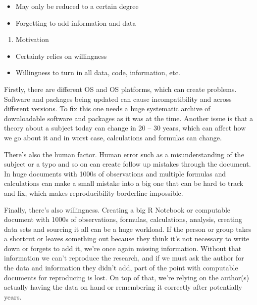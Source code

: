 \documentclass[
  12pt,
  twoside]{article}
\providecommand{\tightlist}{%
  \setlength{\itemsep}{0pt}\setlength{\parskip}{0pt}}
\begin{document}
\begin{itemize}
\tightlist
\item
  May only be reduced to a certain degree
\item
  Forgetting to add information and data
\end{itemize}

\begin{enumerate}
\def\labelenumi{\arabic{enumi}.}
\setcounter{enumi}{3}
\tightlist
\item
  Motivation
\end{enumerate}

\begin{itemize}
\tightlist
\item
  Certainty relies on willingness
\item
  Willingness to turn in all data, code, information, etc.
\end{itemize}

Firstly, there are different OS and OS platforms, which can create
problems. Software and packages being updated can cause incompatibility
and across different versions. To fix this one needs a huge systematic
archive of downloadable software and packages as it was at the time.
Another issue is that a theory about a subject today can change in 20 --
30 years, which can affect how we go about it and in worst case,
calculations and formulas can change.

There's also the human factor. Human error such as a misunderstanding of
the subject or a typo and so on can create follow up mistakes through
the document. In huge documents with 1000s of observations and multiple
formulas and calculations can make a small mistake into a big one that
can be hard to track and fix, which makes reproducibility borderline
impossible.

Finally, there's also willingness. Creating a big R Notebook or
computable document with 1000s of observations, formulas, calculations,
analysis, creating data sets and sourcing it all can be a huge workload.
If the person or group takes a shortcut or leaves something out because
they think it's not necessary to write down or forgets to add it, we're
once again missing information. Without that information we can't
reproduce the research, and if we must ask the author for the data and
information they didn't add, part of the point with computable documents
for reproducing is lost. On top of that, we're relying on the author(s)
actually having the data on hand or remembering it correctly after
potentially years.
\end{document}
